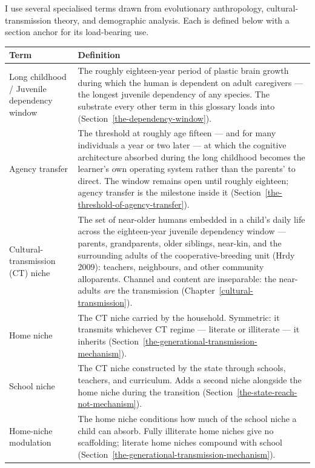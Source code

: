 \documentclass[12pt,letterpaper]{article}
\begin{document}
I use several specialised terms drawn from evolutionary
anthropology, cultural-transmission theory, and demographic
analysis. Each is defined below with a section anchor for its
load-bearing use.

\renewcommand{\arraystretch}{1.15}
\begin{longtable}{@{}p{}p{}@{}}
\toprule
\textbf{Term} & \textbf{Definition} \\
\midrule
\endhead

Long childhood / Juvenile dependency window &
The roughly eighteen-year period of plastic brain growth during which
the human is dependent on adult caregivers --- the longest juvenile
dependency of any species. The substrate every other term in this
glossary loads into
(Section~\ref{the-dependency-window}). \\

Agency transfer &
The threshold at roughly age fifteen --- and for many individuals a
year or two later --- at which the cognitive architecture absorbed
during the long childhood becomes the learner's own operating system
rather than the parents' to direct. The window remains open until
roughly eighteen; agency transfer is the milestone inside it
(Section~\ref{the-threshold-of-agency-transfer}). \\

Cultural-transmission (CT) niche &
The set of near-older humans embedded in a child's daily life across
the eighteen-year juvenile dependency window --- parents,
grandparents, older siblings, near-kin, and the surrounding adults
of the cooperative-breeding unit (Hrdy 2009): teachers, neighbours,
and other community alloparents. Channel and content are
inseparable: the near-adults \emph{are} the transmission
(Chapter~\ref{cultural-transmission}). \\

Home niche &
The CT niche carried by the household. Symmetric: it transmits
whichever CT regime --- literate or illiterate --- it inherits
(Section~\ref{the-generational-transmission-mechanism}). \\

School niche &
The CT niche constructed by the state through schools, teachers, and
curriculum. Adds a second niche alongside the home niche during the
transition (Section~\ref{the-state-reach-not-mechanism}). \\

Home-niche modulation &
The home niche conditions how much of the school niche a child can
absorb. Fully illiterate home niches give no scaffolding; literate
home niches compound with school
(Section~\ref{the-generational-transmission-mechanism}). \\


\end{longtable}
\end{document}

